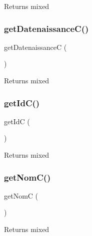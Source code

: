 \begin{DoxyReturn}{Returns}
mixed 
\end{DoxyReturn}
\mbox{\label{class_contact_ac52b57078c77b0418899a0adeddc8973}} 
\subsubsection{\texorpdfstring{get\+Datenaissance\+C()}{getDatenaissanceC()}}
{\footnotesize\ttfamily get\+DatenaissanceC (\begin{DoxyParamCaption}{ }\end{DoxyParamCaption})}

\begin{DoxyReturn}{Returns}
mixed 
\end{DoxyReturn}
\mbox{\label{class_contact_ae447e2401431242a5d60c9ffc3262238}} 
\subsubsection{\texorpdfstring{get\+Id\+C()}{getIdC()}}
{\footnotesize\ttfamily get\+IdC (\begin{DoxyParamCaption}{ }\end{DoxyParamCaption})}

\begin{DoxyReturn}{Returns}
mixed 
\end{DoxyReturn}
\mbox{\label{class_contact_a747e2793a12dc94501708c74a9b2acb2}} 
\subsubsection{\texorpdfstring{get\+Nom\+C()}{getNomC()}}
{\footnotesize\ttfamily get\+NomC (\begin{DoxyParamCaption}{ }\end{DoxyParamCaption})}

\begin{DoxyReturn}{Returns}
mixed 
\end{DoxyReturn}
\mbox{\label{class_contact_ab2eb595967aadaecc1c46a6d900f52e5}} 
